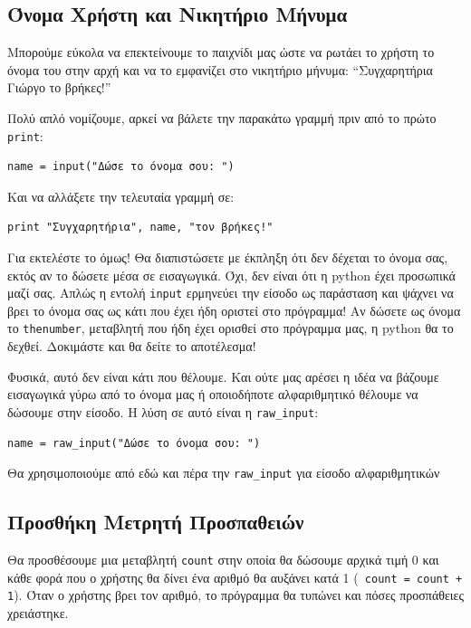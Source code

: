 \subsection{Όνομα Χρήστη και Νικητήριο Μήνυμα}
%
Μπορούμε εύκολα να επεκτείνουμε το παιχνίδι μας ώστε να ρωτάει το χρήστη το όνομα του στην αρχή και να το εμφανίζει στο νικητήριο μήνυμα: ``Συγχαρητήρια Γιώργο το βρήκες!''

Πολύ απλό νομίζουμε, αρκεί να βάλετε την παρακάτω γραμμή πριν από το πρώτο {\tt print}:

\begin{verbatim}
name = input("Δώσε το όνομα σου: ")
\end{verbatim}

Και να αλλάξετε την τελευταία γραμμή σε:

\begin{verbatim}
print "Συγχαρητήρια", name, "τον βρήκες!"
\end{verbatim}

Για εκτελέστε το όμως! Θα διαπιστώσετε με έκπληξη ότι δεν δέχεται το όνομα
σας, εκτός αν το δώσετε μέσα σε εισαγωγικά. Όχι, δεν είναι ότι η python
έχει προσωπικά μαζί σας. Απλώς η εντολή {\tt input} ερμηνεύει την είσοδο ως
παράσταση και ψάχνει να βρει το όνομα σας ως κάτι που έχει ήδη οριστεί στο
πρόγραμμα! Αν δώσετε ως όνομα το {\tt thenumber}, μεταβλητή που ήδη έχει ορισθεί στο πρόγραμμα μας, η python θα το δεχθεί. Δοκιμάστε και θα δείτε το αποτέλεσμα!

Φυσικά, αυτό δεν είναι κάτι που θέλουμε. Και ούτε μας αρέσει η ιδέα να
βάζουμε εισαγωγικά γύρω από το όνομα μας ή οποιοδήποτε αλφαριθμητικό θέλουμε
να δώσουμε στην είσοδο.  Η λύση σε αυτό είναι η {\tt raw\_input}:

\begin{verbatim}
name = raw_input("Δώσε το όνομα σου: ")
\end{verbatim}

Θα χρησιμοποιούμε από εδώ και πέρα την {\tt raw\_input} για είσοδο αλφαριθμητικών
%
\subsection{Προσθήκη Μετρητή Προσπαθειών}
%
Θα προσθέσουμε μια μεταβλητή {\tt count} στην οποία θα δώσουμε αρχικά τιμή 0
και κάθε φορά που ο χρήστης θα δίνει ένα αριθμό θα αυξάνει κατά 1 ({\tt
count = count + 1}). Όταν ο χρήστης βρει τον αριθμό, το πρόγραμμα θα τυπώνει και πόσες προσπάθειες χρειάστηκε.

